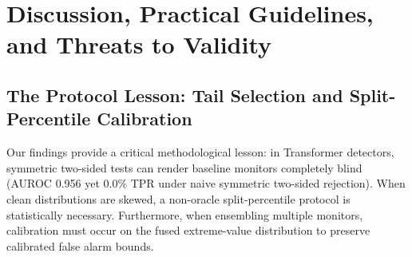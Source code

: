 \documentclass[preprint,12pt]{elsarticle}
\begin{document}
\begin{table}[!htbp]
\centering
\caption{Empirical execution latency and computational overhead profiling on idle Edge CPU platform (Intel Core i5-12600H, \texttt{torch\_num\_threads=4}, $320 \times 320$, PyTorch FP32, 50 independent runs).}
\label{tab:runtime_overhead}
\renewcommand{\arraystretch}{1.40}
\end{table}

\section{Discussion, Practical Guidelines, and Threats to Validity}
\label{sec:discussion}

\subsection{The Protocol Lesson: Tail Selection and Split-Percentile Calibration}
Our findings provide a critical methodological lesson: in Transformer detectors, symmetric two-sided tests can render baseline monitors completely blind (AUROC 0.956 yet 0.0\% TPR under naive symmetric two-sided rejection). When clean distributions are skewed, a non-oracle split-percentile protocol is statistically necessary. Furthermore, when ensembling multiple monitors, calibration must occur on the fused extreme-value distribution to preserve calibrated false alarm bounds.
\end{document}
